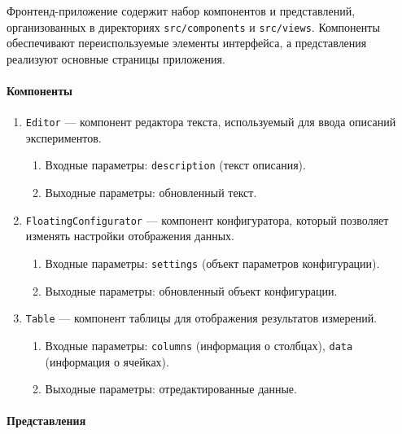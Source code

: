 Фронтенд-приложение содержит набор компонентов и представлений, организованных в директориях \texttt{src/components} и \texttt{src/views}. Компоненты обеспечивают переиспользуемые элементы интерфейса, а представления реализуют основные страницы приложения.

\paragraph{Компоненты}

\begin{enumerate}
    \item \texttt{Editor} — компонент редактора текста, используемый для ввода описаний экспериментов.
    \begin{enumerate}[label=\arabic{enumi}.\arabic*.]
        \item Входные параметры: \texttt{description} (текст описания).
        \item Выходные параметры: обновленный текст.
    \end{enumerate}

    \item \texttt{FloatingConfigurator} — компонент конфигуратора, который позволяет изменять настройки отображения данных.
    \begin{enumerate}[label=\arabic{enumi}.\arabic*.]
        \item Входные параметры: \texttt{settings} (объект параметров конфигурации).
        \item Выходные параметры: обновленный объект конфигурации.
    \end{enumerate}

    \item \texttt{Table} — компонент таблицы для отображения результатов измерений.
    \begin{enumerate}[label=\arabic{enumi}.\arabic*.]
        \item Входные параметры: \texttt{columns} (информация о столбцах), \texttt{data} (информация о ячейках).
        \item Выходные параметры: отредактированные данные.
    \end{enumerate}
\end{enumerate}

\paragraph{Представления}


